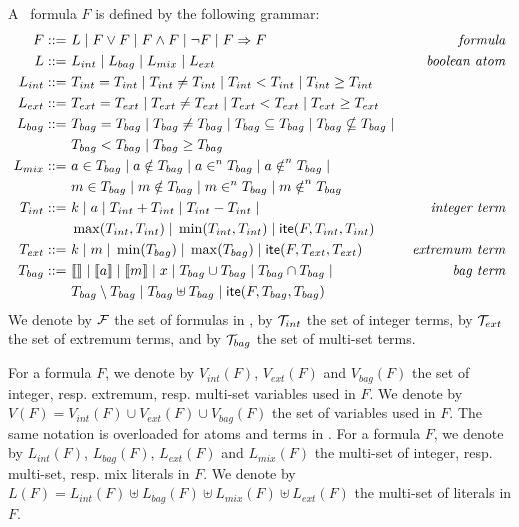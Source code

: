 \begin{mydef}
A \QFBILIA\ formula $F$ is defined by the following grammar:
\begin{align*}
F ::= &\ L \; | \; F\lor F \; | \; F\land F \; | \; \lnot F \; | \; F\Rightarrow F
& \textit{formula}
\\
L ::= &\ L_{int} \; |\; L_{bag} \; |\; L_{mix} \; |\; L_{ext}
& \textit{boolean atom}
\\
L_{int} ::= &\ T_{int} = T_{int} \; |\; T_{int} \neq T_{int} \; |\; T_{int} < T_{int}\; |\;  T_{int} \ge T_{int}
\\
L_{ext} ::= &\ T_{ext} = T_{ext} \; |\; T_{ext} \neq T_{ext} \; |\; T_{ext} < T_{ext}\; |\;  T_{ext} \ge T_{ext}
\\
L_{bag} ::= &\ T_{bag} = T_{bag} \; |\;T_{bag} \neq T_{bag} \; |\;
T_{bag} \subseteq T_{bag} \; |\;T_{bag} \nsubseteq T_{bag} \; | \;
\\
&\ T_{bag} < T_{bag} \; |\;T_{bag} \ge T_{bag}
\\
L_{mix} ::= &\ a \in T_{bag}\; |\;a \notin T_{bag}\; |\;a \in^{n} T_{bag}\; |\;a \notin^{n} T_{bag}\;|\;
\\
&\ m \in T_{bag}\; |\;m \notin T_{bag}\; |\;m \in^{n} T_{bag}\; |\;m \notin^{n} T_{bag}
\\
T_{int} ::= &\  k \;|\; a \;|\; T_{int} + T_{int} \;|\; T_{int} - T_{int}\;|\;
& \textit{integer term}
\\
&\ \max(T_{int},T_{int})\;|\; \min(T_{int},T_{int}) \;|\; \textsf{ite}(F,T_{int},T_{int})
\\
T_{ext} ::= &\ k \;|\; m \;|\; \min(T_{bag}) \;|\; \max(T_{bag}) \;|\; \textsf{ite}(F,T_{ext},T_{ext})
& \textit{extremum term}
\\
T_{bag} ::= &\ \llbracket  \rrbracket\;|\;\llbracket a \rrbracket \;|\;\llbracket m \rrbracket \;|\;x \;|\; T_{bag} \cup T_{bag} \;|\; T_{bag} \cap T_{bag} \;|\;
& \textit{bag term}
\\
&\ T_{bag} \setminus T_{bag}\;|\; T_{bag} \uplus T_{bag} \;|\; \textsf{ite}(F,T_{bag},T_{bag})
\\
\end{align*}
We denote by $\mathcal{F}$ the set of formulas in \QFBILIA, by $\mathcal{T}_{int}$ the set of integer terms, by $\mathcal{T}_{ext}$ the set of extremum terms, and by $\mathcal{T}_{bag}$ the set of multi-set terms.
\end{mydef}

For a formula $F$, we denote by $V_{int}(F)$, $V_{ext}(F)$ and $V_{bag}(F)$  the set of integer, resp. extremum, resp. multi-set variables used in $F$.
We denote by $V(F) = V_{int}(F) \cup V_{ext}(F) \cup V_{bag}(F)$ the set of variables used in $F$.
The same notation is overloaded for atoms and terms in \QFBILIA.
For a formula $F$, we denote by $L_{int}(F)$, $L_{bag}(F)$, $L_{ext}(F)$ and $L_{mix}(F)$ the multi-set of integer, resp. multi-set, resp. mix literals in $F$.
We denote by $L(F) = L_{int}(F) \uplus L_{bag}(F) \uplus L_{mix}(F) \uplus L_{ext}(F)$ the multi-set of literals in $F$.



